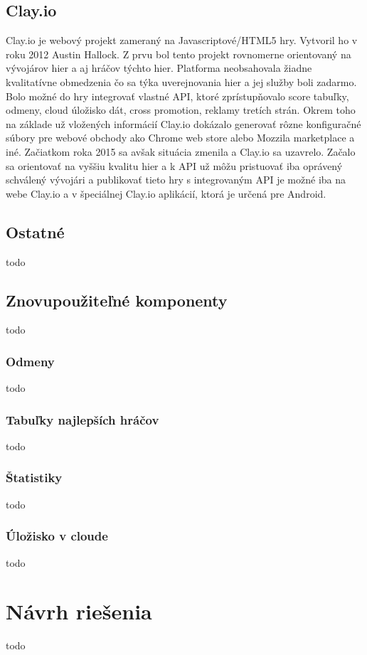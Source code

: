\section{Clay.io}
Clay.io je webový projekt zameraný na Javascriptové/HTML5 hry. Vytvoril ho v roku 2012 Austin Hallock. Z prvu bol tento projekt rovnomerne orientovaný na vývojárov hier a aj hráčov týchto hier. Platforma neobsahovala žiadne kvalitatívne obmedzenia čo sa týka uverejnovania hier a jej služby boli zadarmo. Bolo možné do hry integrovať vlastné API, ktoré zprístupňovalo score tabuľky, odmeny, cloud úložisko dát, cross promotion, reklamy tretích strán. Okrem toho na základe už vložených informácií Clay.io dokázalo generovať rôzne konfiguračné súbory pre webové obchody ako Chrome web store alebo Mozzila marketplace a iné. Začiatkom roka 2015 sa avšak situácia zmenila a Clay.io sa uzavrelo. Začalo sa orientovať na vyššiu kvalitu hier a k API už môžu pristuovať iba oprávený schválený vývojári a publikovať tieto hry s integrovaným API je možné iba na webe Clay.io a v špeciálnej Clay.io aplikácií, ktorá je určená pre Android.    

\section{Ostatné}
todo

\section{Znovupoužiteľné komponenty}
todo

\subsection{Odmeny}
todo

\subsection{Tabuľky najlepších hráčov}
todo

\subsection{Štatistiky}
todo

\subsection{Úložisko v cloude}
todo

\chapter{Návrh riešenia}
\label{chap:navrh}
todo

